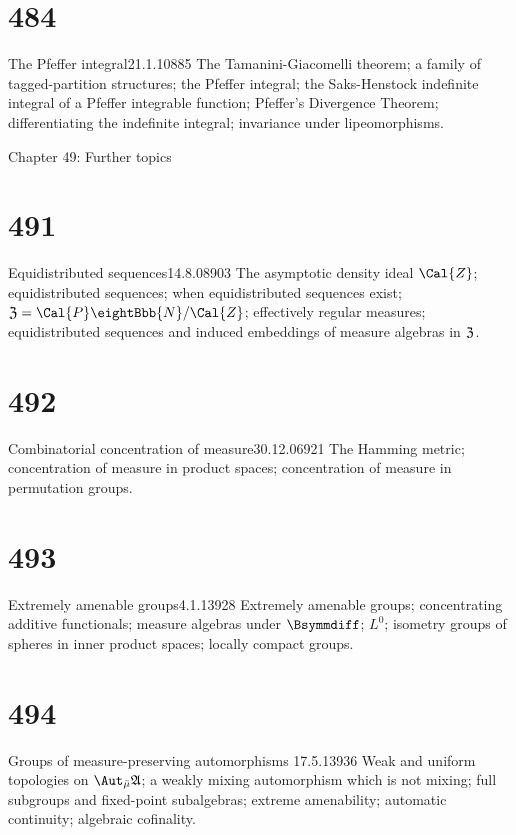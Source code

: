 \section{484}{The Pfeffer integral}{21.1.10}{885}{}
{The Tamanini-Giacomelli theorem;
a family of tagged-partition structures;  the Pfeffer integral;  the
Saks-Henstock indefinite integral of a Pfeffer integrable function;
Pfeffer's Divergence
Theorem;  differentiating the indefinite integral;  invariance under
lipeomorphisms.}


 Chapter 49:  Further topics


\section{491}{Equidistributed sequences}{14.8.08}{903}{}
{The asymptotic density ideal $\Cal{Z}$;  equidistributed sequences;
when equidistributed sequences exist;
$\frak{Z}=\Cal{P}\eightBbb{N}/\Cal{Z}$;
effectively regular measures;  equidistributed sequences and induced
embeddings of measure algebras in $\frak{Z}$.}

\section{492}{Combinatorial concentration of measure}{30.12.06}{921}{}
{The Hamming metric;
concentration of measure in product spaces;  concentration of measure
in permutation groups.}

\section{493}{Extremely amenable groups}{4.1.13}{928}{}
{Extremely amenable groups;  concentrating additive functionals;
measure algebras under $\Bsymmdiff$;  $L^0$;
isometry groups of spheres in inner product spaces;
locally compact groups.}

\section{494}{Groups of measure-preserving automorphisms}
{17.5.13}{936}{}
{Weak and uniform topologies on $\AmuA$;  a weakly mixing automorphism
which is not mixing;  full subgroups and fixed-point
subalgebras;  extreme
amenability;  automatic continuity;  algebraic cofinality.}


